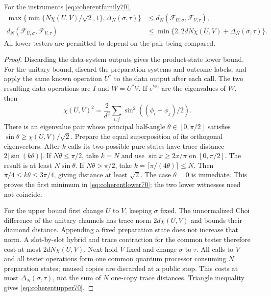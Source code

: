 \begin{lemma}\label{lem:coherentmetric70}
For the instruments \eqref{eq:coherentfamily70},
\begin{align}
 \max\{\min\{N\chi(U,V)/\sqrt2,1\},\Delta_N(\sigma,\tau)\}
  &\le d_N(\mathcal F_{U,\sigma},\mathcal F_{V,\tau}),\label{eq:coherentlower70}\\
 d_N(\mathcal F_{U,\sigma},\mathcal F_{V,\tau})
  &\le\min\{2,2dN\chi(U,V)+\Delta_N(\sigma,\tau)\}.
                                                        \label{eq:coherentupper70}
\end{align}
All lower testers are permitted to depend on the pair being compared.
\end{lemma}
\begin{proof}
Discarding the data-system outputs gives the product-state lower bound.
For the unitary bound, discard the preparation systems and outcome labels,
and apply the same known operation $U^*$ to the data output after each
call. The two resulting data operations are $I$ and $W=U^*V$.
If $e^{i\phi_j}$ are the eigenvalues of $W$, then
\[
 \chi(U,V)^2=\frac2{d^2}\sum_{i,j}
                  \sin^2((\phi_i-\phi_j)/2).
\]
There is an eigenvalue pair whose principal half-angle
$\theta\in[0,\pi/2]$ satisfies $\sin\theta\ge\chi(U,V)/\sqrt2$.
Prepare the equal superposition of its orthogonal eigenvectors. After
$k$ calls its two possible pure states have trace distance
$2|\sin(k\theta)|$. If $N\theta\le\pi/2$, take $k=N$ and use
$\sin x\ge2x/\pi$ on $[0,\pi/2]$. The result is at least
$N\sin\theta$. If $N\theta>\pi/2$, take
$k=\lceil\pi/(4\theta)\rceil\le N$. Then
$\pi/4\le k\theta\le3\pi/4$, giving distance at least $\sqrt2$.
The case $\theta=0$ is immediate. This proves the first minimum in
\eqref{eq:coherentlower70}; the two lower witnesses need not coincide.

For the upper bound first change $U$ to $V$, keeping $\sigma$ fixed.
The unnormalized Choi difference of the unitary channels has trace norm
$2d\chi(U,V)$ and bounds their diamond distance. Appending a fixed
preparation state does not increase that norm. A slot-by-slot hybrid and
trace contraction for the common tester therefore cost at most
$2dN\chi(U,V)$. Next hold $V$ fixed and change $\sigma$ to $\tau$.
All calls to $V$ and all tester operations form one common quantum
processor consuming $N$ preparation states; unused copies are discarded
at a public stop. This costs at most $\Delta_N(\sigma,\tau)$, not the
sum of $N$ one-copy trace distances. Triangle inequality gives
\eqref{eq:coherentupper70}.
\end{proof}

